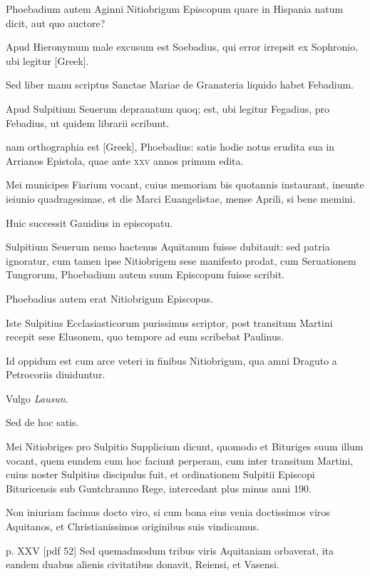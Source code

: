 \begin{parnumbers}
Phoebadium autem Aginni Nitiobrigum
Episcopum quare in Hispania natum dicit, aut quo auctore?

Apud Hieronymum male excusum est Soebadius, qui error irrepsit
ex Sophronio, ubi legitur \textgreek{[Greek]}.

Sed liber manu scriptus
Sanctae Mariae de Granateria liquido habet Febadium.

Apud Sulpitium
Seuerum deprauatum quoq; est, ubi legitur Fegadius, pro
Febadius, ut quidem librarii scribunt.

nam orthographia est \textgreek{[Greek]},
Phoebadius: satis hodie notus erudita sua in Arrianos Epistola,
quae ante \textsc{xxv} annos primum edita.

Mei municipes Fiarium vocant,
cuius memoriam bis quotannis instaurant, ineunte ieiunio
quadragesimae, et die Marci Euangelistae, mense Aprili, si bene
memini.

Huic successit Gauidius in episcopatu.

Sulpitium Seuerum
nemo hactenus Aquitanum fuisse dubitauit: sed patria ignoratur,
cum tamen ipse Nitiobrigem sese manifesto prodat, cum Seruationem
Tungrorum, Phoebadium autem suum Episcopum fuisse scribit.

Phoebadius autem erat Nitiobrigum Episcopus.

Iste Sulpitius
Ecclasiasticorum purissimus scriptor, post transitum Martini recepit
sese Elusonem, quo tempore ad eum scribebat Paulinus.

Id oppidum est cum arce veteri in finibus Nitiobrigum, qua amni Draguto
a Petrocoriis diuiduntur.

Vulgo \textit{Lausun}.

Sed de hoc satis.

Mei
Nitiobriges pro Sulpitio Supplicium dicunt, quomodo et Bituriges
suum illum vocant, quem eundem cum hoc faciunt perperam,
cum inter transitum Martini, cuius noster Sulpitius discipulus fuit,
et ordinationem Sulpitii Episcopi Bituricensis sub Guntchramno
Rege, intercedant plus minus anni 190.

Non iniuriam facimus
docto viro, si cum bona eius venia doctissimos viros Aquitanos,
et Christianissimos originibus suis vindicamus.

\clearpage
p. XXV [pdf 52]
Sed quemadmodum tribus viris Aquitaniam orbaverat, ita eandem duabus
alienis civitatibus donavit, Reiensi, et Vasensi.


\end{parnumbers}
